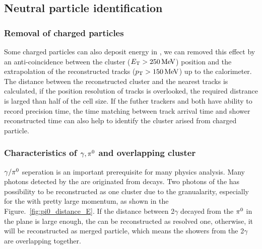 \subsection{Neutral particle identification}
\label{subsec:ecal_identification}

\subsubsection{Removal of charged particles}
Some charged particles can also deposit energy in \ecal, 
we can removed this effect by an anti-coincidence between the cluster ($E_{\mathrm{T}}>250\text{\,Me\kern -0.1em V}$) position 
and the extrapolation of the reconstructed tracks ($p_{\mathrm{T}}>150\text{\,Me\kern -0.1em V}$) up to the calorimeter.
The distance between the reconstructed cluster and the nearest tracks is calculated,
if the position resolution of tracks is overlooked, 
the required distrance is larged than half of the cell size. 
If the futher trackers and \ecal both have ability to record precision time,
the time matching between track arrival time and shower reconstructed time can also help to identify the cluster arised from charged particle.


\subsubsection{Characteristics of $\gamma, {{\pi}^0}$ and overlapping cluster}

$\gamma\slash{\ensuremath{{\pi}^0}}$ seperation is an important prerequisite for many physics analysis\supercite{CalvoGomez:2042173}.
Many photons detected by the \ecal are originated from \piz decays.
Two photons of the \piz has possibility to be reconstructed as one cluster due to the granualarity,
especially for the \piz with pretty large momentum,
as shown in the Figure.~\ref{fig:pi0_distance_E}.
If the distance between 2$\gamma$ decayed from the ${{\pi}^0}$ in the \ecal plane is large enough,
the \piz can be reconstructed as resolved one,
otherwise,
it will be reconstructed as merged particle,
which means the showers from the 2$\gamma$ are overlapping together.





